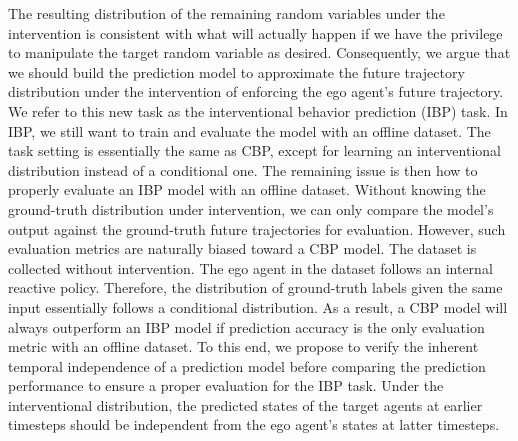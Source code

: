 The resulting distribution of the remaining random variables
under the intervention is consistent with what will actually
happen if we have the privilege to manipulate the target
random variable as desired. Consequently, we argue that we
should build the prediction model to approximate the future
trajectory distribution under the intervention of enforcing
the ego agent’s future trajectory. We refer to this new
task as the interventional behavior prediction (IBP) task.
In IBP, we still want to train and evaluate the model with
an offline dataset. The task setting is essentially the same
as CBP, except for learning an interventional distribution
instead of a conditional one. The remaining issue is then
how to properly evaluate an IBP model with an offline
dataset. Without knowing the ground-truth distribution under
intervention, we can only compare the model’s output against
the ground-truth future trajectories for evaluation. However,
such evaluation metrics are naturally biased toward a CBP
model. The dataset is collected without intervention. The
ego agent in the dataset follows an internal reactive policy.
Therefore, the distribution of ground-truth labels given the
same input essentially follows a conditional distribution. As
a result, a CBP model will always outperform an IBP model
if prediction accuracy is the only evaluation metric with an
offline dataset.
To this end, we propose to verify the inherent temporal
independence of a prediction model before comparing the
prediction performance to ensure a proper evaluation for the
IBP task. Under the interventional distribution, the predicted
states of the target agents at earlier timesteps should be
independent from the ego agent’s states at latter timesteps.




